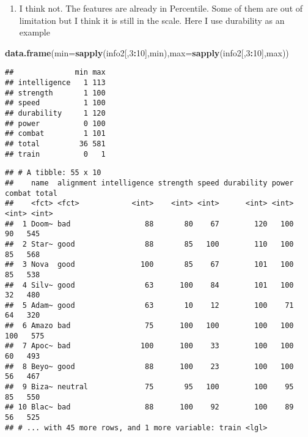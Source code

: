 \documentclass[]{article}
\newenvironment{Shaded}{\begin{snugshade}}{\end{snugshade}}
\newcommand{\DataTypeTok}[1]{\textcolor[rgb]{0.13,0.29,0.53}{#1}}
\newcommand{\DecValTok}[1]{\textcolor[rgb]{0.00,0.00,0.81}{#1}}
\newcommand{\KeywordTok}[1]{\textcolor[rgb]{0.13,0.29,0.53}{\textbf{#1}}}
\newcommand{\NormalTok}[1]{#1}
\newcommand{\OperatorTok}[1]{\textcolor[rgb]{0.81,0.36,0.00}{\textbf{#1}}}
\newcommand{\StringTok}[1]{\textcolor[rgb]{0.31,0.60,0.02}{#1}}
\providecommand{\tightlist}{%
  \setlength{\itemsep}{0pt}\setlength{\parskip}{0pt}}
\begin{document}
\begin{enumerate}
\def\labelenumi{\arabic{enumi}.}
\setcounter{enumi}{2}
\tightlist
\item
  I think not. The features are already in Percentile. Some of them are
  out of limitation but I think it is still in the scale. Here I use
  durability as an example
\end{enumerate}

\begin{Shaded}
\begin{Highlighting}[]
\KeywordTok{data.frame}\NormalTok{(}\DataTypeTok{min=}\KeywordTok{sapply}\NormalTok{(info2[,}\DecValTok{3}\OperatorTok{:}\DecValTok{10}\NormalTok{],min),}\DataTypeTok{max=}\KeywordTok{sapply}\NormalTok{(info2[,}\DecValTok{3}\OperatorTok{:}\DecValTok{10}\NormalTok{],max))}
\end{Highlighting}
\end{Shaded}

\begin{verbatim}
##              min max
## intelligence   1 113
## strength       1 100
## speed          1 100
## durability     1 120
## power          0 100
## combat         1 101
## total         36 581
## train          0   1
\end{verbatim}

\begin{Shaded}
\end{Shaded}

\begin{verbatim}
## # A tibble: 55 x 10
##    name  alignment intelligence strength speed durability power combat total
##    <fct> <fct>            <int>    <int> <int>      <int> <int>  <int> <int>
##  1 Doom~ bad                 88       80    67        120   100     90   545
##  2 Star~ good                88       85   100        110   100     85   568
##  3 Nova  good               100       85    67        101   100     85   538
##  4 Silv~ good                63      100    84        101   100     32   480
##  5 Adam~ good                63       10    12        100    71     64   320
##  6 Amazo bad                 75      100   100        100   100    100   575
##  7 Apoc~ bad                100      100    33        100   100     60   493
##  8 Beyo~ good                88      100    23        100   100     56   467
##  9 Biza~ neutral             75       95   100        100    95     85   550
## 10 Blac~ bad                 88      100    92        100    89     56   525
## # ... with 45 more rows, and 1 more variable: train <lgl>
\end{verbatim}
\end{document}
